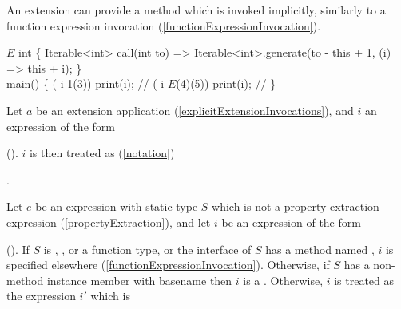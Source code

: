 \documentclass[makeidx]{article}
\begin{document}
\LMHash{}%
An extension can provide a \CALL{} method which is invoked implicitly,
similarly to a function expression invocation
(\ref{functionExpressionInvocation}).


\begin{dartCode}
\EXTENSION{} $E$ \ON{} int \{
  Iterable<int> call(int to) =>
      Iterable<int>.generate(to - this + 1, (i) => this + i);
\}
\\
\VOID{} main() \{
  \FOR{} (\VAR{} i \IN{} 1(3)) print(i); // 
  \FOR{} (\VAR{} i \IN{} $E$(4)(5)) print(i); // 
\}
\end{dartCode}


\LMHash{}%
%
Let $a$ be an extension application
(\ref{explicitExtensionInvocations}),
and $i$ an expression of the form

\noindent
{}

\noindent
().
$i$ is then treated as
(\ref{notation})

\noindent
{}.


\LMHash{}%
%
Let $e$ be an expression with static type $S$
which is not a property extraction expression
(\ref{propertyExtraction}),
and let $i$ be an expression of the form

\noindent
{}

\noindent
().
If $S$ is \DYNAMIC, \FUNCTION, or a function type,
or the interface of $S$ has a method named \CALL,
$i$ is specified elsewhere
(\ref{functionExpressionInvocation}).
Otherwise, if $S$ has a non-method instance member with basename \CALL{}
then $i$ is a .
Otherwise, $i$ is treated as the expression $i'$ which is
\end{document}
